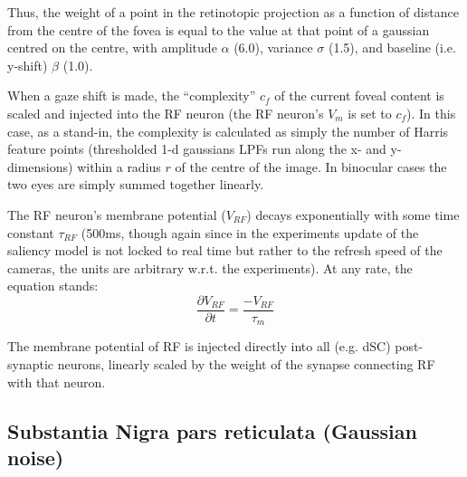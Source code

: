 \documentclass[conference]{IEEEtran}
\begin{document}
Thus, the weight of a point in the retinotopic projection as a
function of distance from the centre of the fovea is equal to the
value at that point of a gaussian centred on the centre, with
amplitude $\alpha$ (6.0), variance $\sigma$ (1.5), and baseline
(i.e. y-shift) $\beta$ (1.0).

When a gaze shift is made, the ``complexity'' $c_f$ of the current
foveal content is scaled and injected into the RF neuron (the RF
neuron's $V_m$ is set to $c_f$). In this case, as a stand-in, the
complexity is calculated as simply the number of Harris feature points
(thresholded 1-d gaussians LPFs run along the x- and y-dimensions)
within a radius $r$ of the centre of the image. In binocular cases the
two eyes are simply summed together linearly.

The RF neuron's membrane potential ($V_{RF}$) decays exponentially
with some time constant $\tau_{RF}$ (500ms, though again since in the
experiments update of the saliency model is not locked to real time
but rather to the refresh speed of the cameras, the units are
arbitrary w.r.t. the experiments). At any rate, the equation stands:
\begin{equation}
\frac{\partial V_{RF}}{\partial t} = \frac{-V_{RF}}{\tau_m}
\end{equation}

The membrane potential of RF is injected directly into all (e.g. dSC)
post-synaptic neurons, linearly scaled by the weight of the synapse
connecting RF with that neuron.

\subsection{Substantia Nigra pars reticulata (Gaussian noise)}
\end{document}
